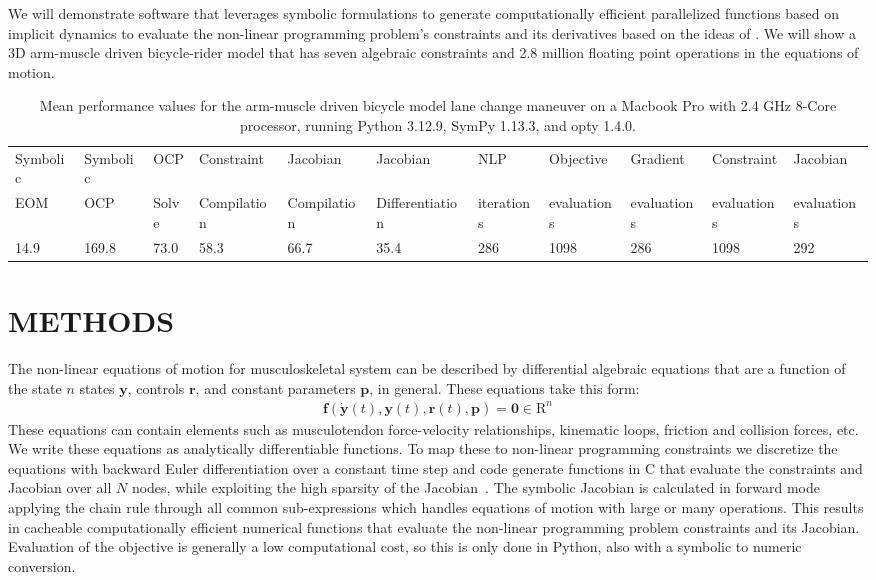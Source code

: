 \documentclass[11pt,twocolumn]{article}
\begin{document}
We will demonstrate software that leverages symbolic formulations to generate
computationally efficient parallelized functions based on implicit dynamics to
evaluate the non-linear programming problem's constraints and its derivatives
based on the ideas of \cite{vandenBogert2011a}. We will show a 3D arm-muscle
driven bicycle-rider model that has seven algebraic constraints and 2.8 million
floating point operations in the equations of motion.
%
\begin{table}[t]
  \centering
  \caption{Mean performance values for the arm-muscle driven bicycle model lane
  change maneuver on a Macbook Pro with 2.4 GHz 8-Core processor, running Python 3.12.9, SymPy 1.13.3, and opty 1.4.0.}
  \scriptsize
  \begin{tabular}{lllllllllll}
    Symbolic & Symbolic & OCP & Constraint & Jacobian  & Jacobian & NLP & Objective &  Gradient & Constraint & Jacobian \\
    EOM & OCP & Solve & Compilation &  Compilation & Differentiation & iterations & evaluations & evaluations & evaluations & evaluations \\
    14.9 & 169.8 & 73.0 & 58.3 & 66.7 & 35.4 & 286 & 1098 & 286 & 1098 & 292
  \end{tabular}
  \label{tab:performance}
\end{table}

\section*{METHODS}
%
The non-linear equations of motion for musculoskeletal system can be described
by differential algebraic equations that are a function of the state \(n\)
states \(\mathbf{y}\), controls \(\mathbf{r}\), and constant parameters
\(\mathbf{p}\), in general. These equations take this form:
%
\begin{align}
  \mathbf{f}(\dot{\mathbf{y}}(t), \mathbf{y}(t), \mathbf{r}(t), \mathbf{p}) =
  \mathbf{0} \in \mathrm{R}^n
\end{align}
%
These equations can contain elements such as musculotendon force-velocity
relationships, kinematic loops, friction and collision forces, etc. We write
these equations as analytically differentiable functions. To map these to
non-linear programming constraints we discretize the equations with backward
Euler differentiation over a constant time step and code generate functions in C
that evaluate the constraints and Jacobian over all \(N\) nodes, while
exploiting the high sparsity of the Jacobian~\cite{Moore2018}. The symbolic
Jacobian is calculated in forward mode applying the chain rule through all
common sub-expressions which handles equations of motion with large or many
operations. This results in cacheable computationally efficient numerical
functions that evaluate the non-linear programming problem constraints and its
Jacobian. Evaluation of the objective is generally a low computational cost, so
this is only done in Python, also with a symbolic to numeric conversion.
\end{document}
